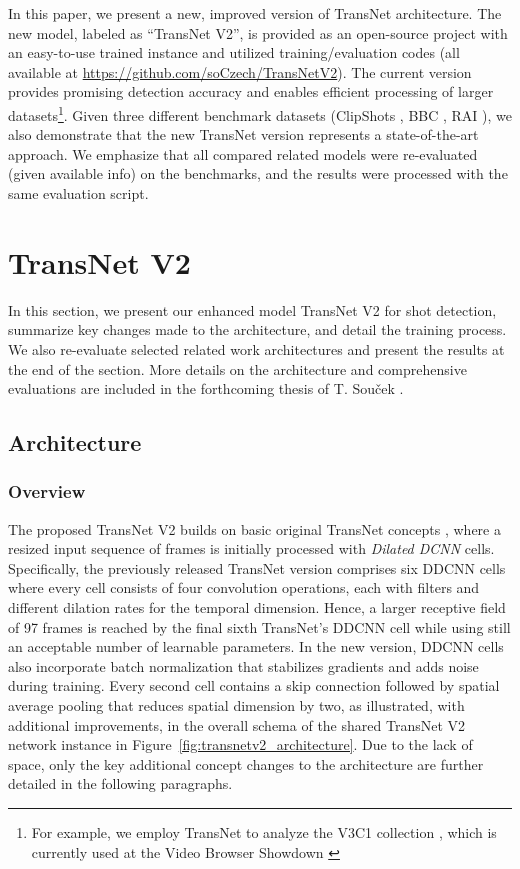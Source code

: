 \documentclass[sigconf]{acmart}
\begin{document}
In this paper, we present a new, improved version of TransNet architecture. The new model, labeled as ``TransNet V2'', is provided as an open-source project with an easy-to-use trained instance and utilized training/evaluation codes (all available at \url{https://github.com/soCzech/TransNetV2}). The current version provides promising detection accuracy and enables efficient processing of larger datasets\footnote{For example, we employ TransNet to analyze the V3C1 collection \cite{V3C}, which is currently used at the Video Browser Showdown \cite{9037125}}. Given three different benchmark datasets (ClipShots \cite{Tang2018clipshots}, BBC \cite{Baraldi2015SceneSiamDet_BBC}, RAI \cite{Baraldi15RAI}), we also demonstrate that the new TransNet version represents a state-of-the-art approach. We  emphasize that all compared related models were re-evaluated (given available info) on the benchmarks, and the results were processed with the same evaluation script.





\section{TransNet V2}
In this section, we present our enhanced model TransNet V2 for shot detection, summarize key changes made to the architecture, and detail the training process. We also re-evaluate selected related work architectures and present the results at the end of the section.
More details on the architecture and comprehensive evaluations are included in the forthcoming thesis of T. Sou\v{c}ek \cite{soucek2020}.


\subsection{Architecture}
\subsubsection{Overview}
The proposed TransNet V2 builds on basic original TransNet concepts \cite{transnet}, where a resized input sequence of frames is initially processed with \emph{Dilated DCNN} cells. Specifically, the previously released TransNet version comprises six DDCNN cells where every cell consists of four  convolution operations, each with  filters and different dilation rates  for the temporal dimension. Hence, a larger receptive field of 97 frames is reached by the final sixth TransNet's DDCNN cell while using still an acceptable number of learnable parameters. In the new version, DDCNN cells also incorporate batch normalization that stabilizes gradients and adds noise during training. Every second cell contains a skip connection followed by spatial average pooling that reduces spatial dimension by two, as illustrated, with additional improvements, in the overall schema of the shared TransNet V2 network instance in Figure~\ref{fig:transnetv2_architecture}. Due to the lack of space, only the key additional concept changes to the architecture are further detailed in the following paragraphs.
\end{document}
